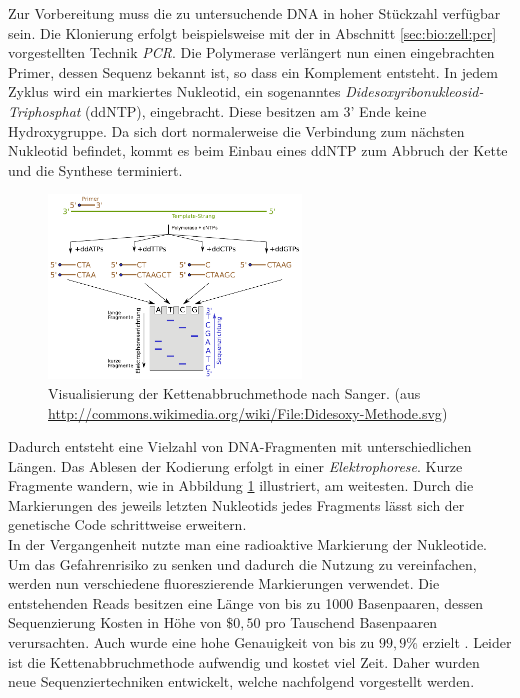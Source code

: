Zur Vorbereitung muss die zu untersuchende DNA in hoher Stückzahl verfügbar sein. Die Klonierung erfolgt beispielsweise mit der in Abschnitt \ref{sec:bio:zell:pcr} vorgestellten Technik \textit{PCR}. Die Polymerase verlängert nun einen eingebrachten Primer, dessen Sequenz bekannt ist, so dass ein Komplement entsteht. In jedem Zyklus wird ein markiertes Nukleotid, ein sogenanntes \textit{Didesoxyribonukleosid-Triphosphat} (ddNTP), eingebracht. Diese besitzen am 3' Ende keine Hydroxygruppe. Da sich dort normalerweise die Verbindung zum nächsten Nukleotid befindet, kommt es beim Einbau eines ddNTP zum Abbruch der Kette und die Synthese terminiert.
\begin{figure}[htb]
	\begin{center}
		\includegraphics[width=0.6\textwidth]{bilder/Sequenzierung_Kettenabbruch}
	\end{center}
	\caption[Visualisierung der Kettenabbruchmethode nach Sanger. (aus \protect\url{http://commons.wikimedia.org/wiki/File:Didesoxy-Methode.svg})]{Visualisierung der Kettenabbruchmethode nach Sanger. (aus \protect\url{http://commons.wikimedia.org/wiki/File:Didesoxy-Methode.svg})}
	\label{fig:bio:seq:kette}
\end{figure}
Dadurch entsteht eine Vielzahl von DNA-Fragmenten mit unterschiedlichen Längen. Das Ablesen der Kodierung erfolgt in einer \textit{Elektrophorese}. Kurze Fragmente wandern, wie in Abbildung \ref{fig:bio:seq:kette} illustriert, am weitesten. Durch die Markierungen des jeweils letzten Nukleotids jedes Fragments lässt sich der genetische Code schrittweise erweitern. \\
In der Vergangenheit nutzte man eine radioaktive Markierung der Nukleotide. Um das Gefahrenrisiko zu senken und dadurch die Nutzung zu vereinfachen, werden nun verschiedene fluoreszierende Markierungen verwendet. 
Die entstehenden Reads besitzen eine Länge von bis zu 1000 Basenpaaren, dessen Sequenzierung Kosten in Höhe von $\$0{,}50$ pro Tauschend Basenpaaren verursachten. Auch wurde eine hohe Genauigkeit von bis zu $99{,}9 \%$ erzielt \citep{Shendure2008}. Leider ist die Kettenabbruchmethode aufwendig und kostet viel Zeit. Daher wurden neue Sequenziertechniken entwickelt, welche nachfolgend vorgestellt werden.

